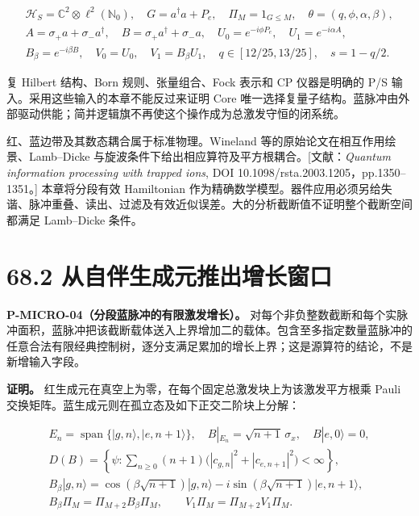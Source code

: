 \documentclass[
  11pt,
  oneside]{book}
\begin{document}
\[
\begin{gathered}
\mathcal H_S=\mathbb C^2\otimes\ell^2(\mathbb N_0),\quad
G=a^\dagger a+P_e,\quad \Pi_M=1_{G\le M},\quad
\theta=(q,\phi,\alpha,\beta),\\
A=\sigma_+a+\sigma_-a^\dagger,\quad
B=\sigma_+a^\dagger+\sigma_-a,\quad
U_0=e^{-i\phi P_e},\quad U_1=e^{-i\alpha A},\\
B_\beta=e^{-i\beta B},\quad V_0=U_0,\quad V_1=B_\beta U_1,\quad
q\in[12/25,13/25],\quad s=1-q/2.
\end{gathered}
\]

复 Hilbert 结构、Born 规则、张量组合、Fock 表示和 CP 仪器是明确的 P/S
输入。采用这些输入的本章不能反过来证明 Core
唯一选择复量子结构。蓝脉冲由外部驱动供能；简并逻辑旗不再使这个操作成为总激发守恒的闭系统。

红、蓝边带及其数态耦合属于标准物理。Wineland
等的原始论文在相互作用绘景、Lamb--Dicke
与旋波条件下给出相应算符及平方根耦合。{[}文献：\emph{Quantum information
processing with trapped ions}, DOI
10.1098/rsta.2003.1205，pp.1350--1351。{]} 本章将分段有效 Hamiltonian
作为精确数学模型。器件应用必须另给失谐、脉冲重叠、读出、过滤及有效近似误差。大的分析截断值不证明整个截断空间都满足
Lamb--Dicke 条件。

\section{68.2 从自伴生成元推出增长窗口}

\protect\hypertarget{p-micro-04}{}{}

\textbf{P-MICRO-04（分段蓝脉冲的有限激发增长）。}
对每个非负整数截断和每个实脉冲面积，蓝脉冲把该截断载体送入上界增加二的载体。包含至多指定数量蓝脉冲的任意合法有限经典控制树，逐分支满足累加的增长上界；这是源算符的结论，不是新增输入字段。

\textbf{证明。}
红生成元在真空上为零，在每个固定总激发块上为该激发平方根乘 Pauli
交换矩阵。蓝生成元则在孤立态及如下正交二阶块上分解：

\[
\begin{gathered}
E_n=\operatorname{span}\{|g,n\rangle,|e,n+1\rangle\},\quad
B|_{E_n}=\sqrt{n+1}\,\sigma_x,\quad B|e,0\rangle=0,\\
D(B)=\left\{\psi:\sum_{n\ge0}(n+1)
\bigl(|c_{g,n}|^2+|c_{e,n+1}|^2\bigr)<\infty\right\},\\
B_\beta|g,n\rangle=
\cos(\beta\sqrt{n+1})|g,n\rangle
-i\sin(\beta\sqrt{n+1})|e,n+1\rangle,\\
B_\beta\Pi_M=\Pi_{M+2}B_\beta\Pi_M,\qquad
V_1\Pi_M=\Pi_{M+2}V_1\Pi_M.
\end{gathered}
\]
\end{document}
